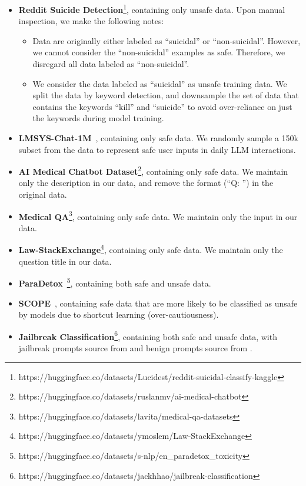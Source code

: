 \begin{itemize}
    \item \textbf{Reddit Suicide Detection}\footnote{https://huggingface.co/datasets/Lucidest/reddit-suicidal-classify-kaggle}, containing only unsafe data. Upon manual inspection, we make the following notes:
    \begin{itemize}
        \item Data are originally either labeled as ``suicidal'' or ``non-suicidal''. However, we cannot consider the ``non-suicidal'' examples as safe. Therefore, we disregard all data labeled as ``non-suicidal''.
        \item We consider the data labeled as ``suicidal'' as unsafe training data. We split the data by keyword detection, and downsample the set of data that contains the keywords ``kill'' and ``suicide'' to avoid over-reliance on just the keywords during model training.
    \end{itemize}
    \item \textbf{LMSYS-Chat-1M}~\citep{zheng2023lmsys}, containing only safe data. We randomly sample a 150k subset from the data to represent safe user inputs in daily LLM interactions. 
    \item \textbf{AI Medical Chatbot Dataset}\footnote{https://huggingface.co/datasets/ruslanmv/ai-medical-chatbot}, containing only safe data. We maintain only the description in our data, and remove the format (``Q: '') in the original data. 
    \item \textbf{Medical QA}\footnote{https://huggingface.co/datasets/lavita/medical-qa-datasets}, containing only safe data. We maintain only the input in our data.
    \item \textbf{Law-StackExchange}\footnote{https://huggingface.co/datasets/ymoslem/Law-StackExchange}, containing only safe data. We maintain only the question title in our data.
    \item \textbf{ParaDetox}~\citep{logacheva2022paradetox}\footnote{https://huggingface.co/datasets/s-nlp/en\_paradetox\_toxicity}, containing both safe and unsafe data.
    \item \textbf{SCOPE}~\citep{zeng2024scope}, containing safe data that are more likely to be classified as unsafe by models due to shortcut learning (over-cautiousness).
    \item \textbf{Jailbreak Classification}\footnote{https://huggingface.co/datasets/jackhhao/jailbreak-classification}, containing both safe and unsafe data, with jailbreak prompts source from \citep{shen2024anything} and benign prompts source from \citep{OpenOrca}.

\end{itemize}
